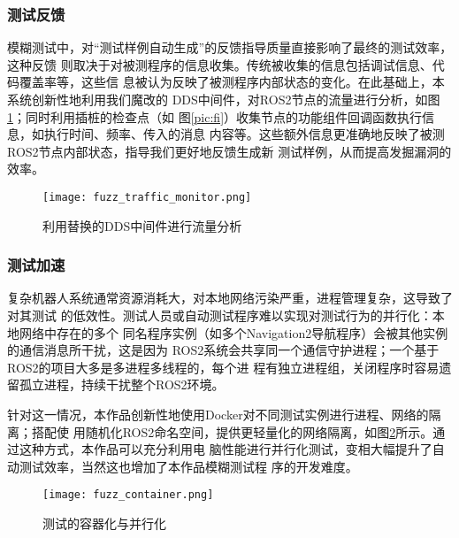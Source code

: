 \subsubsection{测试反馈}
模糊测试中，对“测试样例自动生成”的反馈指导质量直接影响了最终的测试效率，这种反馈
则取决于对被测程序的信息收集。传统被收集的信息包括调试信息、代码覆盖率等，这些信
息被认为反映了被测程序内部状态的变化。在此基础上，本系统创新性地利用我们魔改的
DDS中间件，对ROS2节点的流量进行分析，如图\ref{pic:ftm}；同时利用插桩的检查点（如
图\ref{pic:fi}）收集节点的功能组件回调函数执行信息，如执行时间、频率、传入的消息
内容等。这些额外信息更准确地反映了被测ROS2节点内部状态，指导我们更好地反馈生成新
测试样例，从而提高发掘漏洞的效率。

\begin{figure}[h]
    \centering
    \texttt{[image: fuzz\_traffic\_monitor.png]}
    \caption{利用替换的DDS中间件进行流量分析}
    \label{pic:ftm}
\end{figure}


\subsubsection{测试加速}

复杂机器人系统通常资源消耗大，对本地网络污染严重，进程管理复杂，这导致了对其测试
的低效性。测试人员或自动测试程序难以实现对测试行为的并行化：本地网络中存在的多个
同名程序实例（如多个Navigation2导航程序）会被其他实例的通信消息所干扰，这是因为
ROS2系统会共享同一个通信守护进程；一个基于ROS2的项目大多是多进程多线程的，每个进
程有独立进程组，关闭程序时容易遗留孤立进程，持续干扰整个ROS2环境。

针对这一情况，本作品创新性地使用Docker对不同测试实例进行进程、网络的隔离；搭配使
用随机化ROS2命名空间，提供更轻量化的网络隔离，如图\ref{pic:fc}所示。通过这种方式，本作品可以充分利用电
脑性能进行并行化测试，变相大幅提升了自动测试效率，当然这也增加了本作品模糊测试程
序的开发难度。

\begin{figure}[h]
    \centering
    \texttt{[image: fuzz\_container.png]}
    \caption{测试的容器化与并行化}
    \label{pic:fc}
\end{figure}

